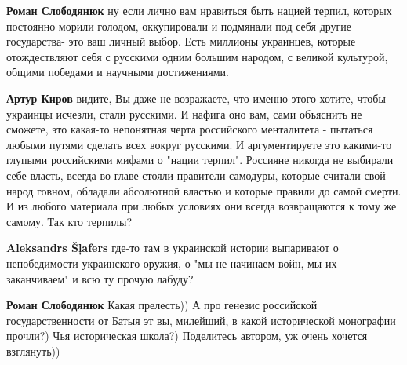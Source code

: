 \begin{itemize}
\begin{itemize}
 
\textbf{Роман Слободянюк} ну если лично вам нравиться быть нацией терпил, которых постоянно морили голодом, оккупировали и подмянали под себя другие государства- это ваш личный выбор. Есть миллионы украинцев, которые отождествляют себя с русскими одним большим народом, с великой культурой, общими победами и научными достижениями.

 
\textbf{Артур Киров} видите, Вы даже не возражаете, что именно этого хотите, чтобы украинцы исчезли, стали русскими. И нафига оно вам, сами объяснить не сможете, это какая-то непонятная черта российского менталитета - пытаться любыми путями сделать всех вокруг русскими. И аргументируете это какими-то глупыми российскими мифами о "нации терпил". Россияне никогда не выбирали себе власть, всегда во главе стояли правители-самодуры, которые считали свой народ говном, обладали абсолютной властью и которые правили до самой смерти. И из любого материала при любых условиях они всегда возвращаются к тому же самому. Так кто терпилы?

 
\textbf{Aleksandrs Šļafers} где-то там в украинской истории выпаривают о непобедимости украинского оружия, о "мы не начинаем войн, мы их заканчиваем" и всю ту прочую лабуду?

 
\textbf{Роман Слободянюк} Какая прелесть)) А про генезис российской государственности от Батыя эт вы, милейший, в какой исторической монографии прочли?) Чья историческая школа?) Поделитесь автором, уж очень хочется взглянуть))


\end{itemize}
\end{itemize}
